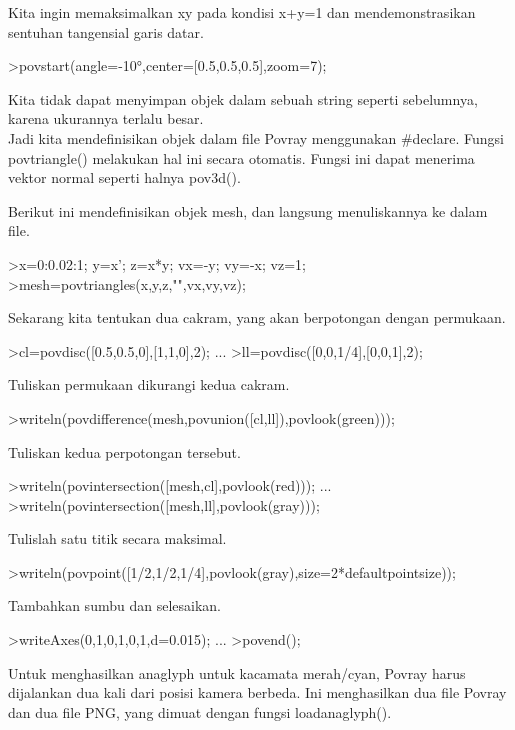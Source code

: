 \documentclass{article}
\begin{document}
\begin{eulernotebook}
\begin{eulercomment}
Kita ingin memaksimalkan xy pada kondisi x+y=1 dan mendemonstrasikan
sentuhan tangensial garis datar.
\end{eulercomment}
\begin{eulerprompt}
>povstart(angle=-10°,center=[0.5,0.5,0.5],zoom=7);
\end{eulerprompt}
\begin{eulercomment}
Kita tidak dapat menyimpan objek dalam sebuah string seperti
sebelumnya, karena ukurannya terlalu besar.\\
Jadi kita mendefinisikan objek dalam file Povray menggunakan #declare.
Fungsi povtriangle() melakukan hal ini secara otomatis. Fungsi ini
dapat menerima vektor normal seperti halnya pov3d().

Berikut ini mendefinisikan objek mesh, dan langsung menuliskannya ke
dalam file.
\end{eulercomment}
\begin{eulerprompt}
>x=0:0.02:1; y=x'; z=x*y; vx=-y; vy=-x; vz=1;
>mesh=povtriangles(x,y,z,"",vx,vy,vz);
\end{eulerprompt}
\begin{eulercomment}
Sekarang kita tentukan dua cakram, yang akan berpotongan dengan
permukaan.
\end{eulercomment}
\begin{eulerprompt}
>cl=povdisc([0.5,0.5,0],[1,1,0],2); ...
>ll=povdisc([0,0,1/4],[0,0,1],2);
\end{eulerprompt}
\begin{eulercomment}
Tuliskan permukaan dikurangi kedua cakram.
\end{eulercomment}
\begin{eulerprompt}
>writeln(povdifference(mesh,povunion([cl,ll]),povlook(green)));
\end{eulerprompt}
\begin{eulercomment}
Tuliskan kedua perpotongan tersebut.
\end{eulercomment}
\begin{eulerprompt}
>writeln(povintersection([mesh,cl],povlook(red))); ...
>writeln(povintersection([mesh,ll],povlook(gray)));
\end{eulerprompt}
\begin{eulercomment}
Tulislah satu titik secara maksimal.
\end{eulercomment}
\begin{eulerprompt}
>writeln(povpoint([1/2,1/2,1/4],povlook(gray),size=2*defaultpointsize));
\end{eulerprompt}
\begin{eulercomment}
Tambahkan sumbu dan selesaikan.
\end{eulercomment}
\begin{eulerprompt}
>writeAxes(0,1,0,1,0,1,d=0.015); ...
>povend();
\end{eulerprompt}
\begin{eulercomment}
Untuk menghasilkan anaglyph untuk kacamata merah/cyan, Povray harus
dijalankan dua kali dari posisi kamera berbeda. Ini menghasilkan dua
file Povray dan dua file PNG, yang dimuat dengan fungsi
loadanaglyph().


\end{eulercomment}
\end{eulernotebook}
\end{document}
